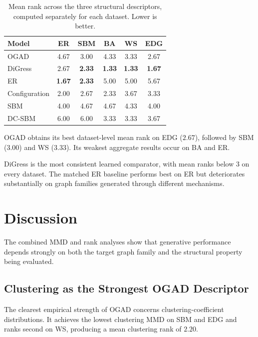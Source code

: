 \begin{table}[htbp]
    \centering
    \caption{Mean rank across the three structural descriptors, computed separately for each dataset. Lower is better.}
    \label{tab:exp_rank_dataset}
    \begin{tabular}{lccccc}
        \hline
        Model & ER & SBM & BA & WS & EDG \\
        \hline
        OGAD          & 4.67 & 3.00 & 4.33 & 3.33 & 2.67 \\
        DiGress       & 2.67 & \textbf{2.33} & \textbf{1.33} & \textbf{1.33} & \textbf{1.67} \\
        ER            & \textbf{1.67} & \textbf{2.33} & 5.00 & 5.00 & 5.67 \\
        Configuration & 2.00 & 2.67 & 2.33 & 3.67 & 3.33 \\
        SBM           & 4.00 & 4.67 & 4.67 & 4.33 & 4.00 \\
        DC-SBM        & 6.00 & 6.00 & 3.33 & 3.33 & 3.67 \\
        \hline
    \end{tabular}
\end{table}

OGAD obtains its best dataset-level mean rank on EDG (\(2.67\)), followed by SBM (\(3.00\)) and WS (\(3.33\)). Its weakest aggregate results occur on BA and ER.

DiGress is the most consistent learned comparator, with mean ranks below \(3\) on every dataset. The matched ER baseline performs best on ER but deteriorates substantially on graph families generated through different mechanisms.


\section{Discussion}
\label{sec:exp_discussion}

The combined MMD and rank analyses show that generative performance depends strongly on both the target graph family and the structural property being evaluated.

\subsection{Clustering as the Strongest OGAD Descriptor}

The clearest empirical strength of OGAD concerns clustering-coefficient distributions. It achieves the lowest clustering MMD on SBM and EDG and ranks second on WS, producing a mean clustering rank of \(2.20\).

